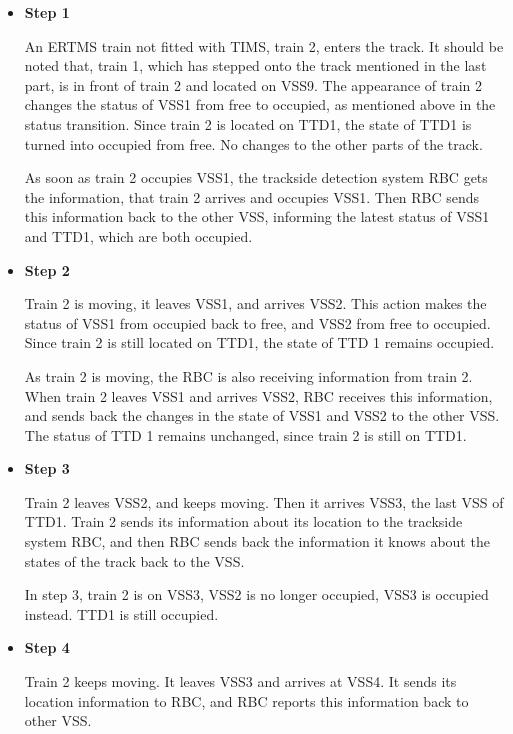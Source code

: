\documentclass[article,dr=phil,type=drfinal,colorback,accentcolor=tud9c]{tudthesis}
\begin{document}
  \begin{itemize}
	
	\item \textbf{Step 1}
	
    An ERTMS train not fitted with TIMS, train 2, enters the track. It should be noted that, train 1, which has stepped onto the track mentioned in the last part, is in front of train 2 and located on VSS9. The appearance of train 2 changes the status of VSS1 from free to occupied, as mentioned above in the status transition. Since train 2 is located on TTD1, the state of TTD1 is turned into occupied from free. No changes to the other parts of the track. 
    
    As soon as train 2 occupies VSS1, the trackside detection system RBC gets the information, that train 2 arrives and occupies VSS1. Then RBC sends this information back to the other VSS, informing the latest status of VSS1 and TTD1, which are both occupied.    
	
	\item \textbf{Step 2}
	
    Train 2 is moving, it leaves VSS1, and arrives VSS2. This action makes the status of VSS1 from occupied back to free, and VSS2 from free to occupied. Since train 2 is still located on TTD1, the state of TTD 1 remains occupied.
    
    As train 2 is moving, the RBC is also receiving information from train 2. When train 2 leaves VSS1 and arrives VSS2, RBC receives this information, and sends back the changes in the state of VSS1 and VSS2 to the other VSS. The status of TTD 1 remains unchanged, since train 2 is still on TTD1.

	\item \textbf{Step 3}
	
    Train 2 leaves VSS2, and keeps moving. Then it arrives VSS3, the last VSS of TTD1. Train 2 sends its information about its location to the trackside system RBC, and then RBC sends back the information it knows about the states of the track back to the VSS.
    
    In step 3, train 2 is on VSS3, VSS2 is no longer occupied, VSS3 is occupied instead. TTD1 is still occupied.
    
    \item \textbf{Step 4}
    
    Train 2 keeps moving. It leaves VSS3 and arrives at VSS4. It sends its location information to RBC, and RBC reports this information back to other VSS.
    

\end{itemize}
\end{document}
